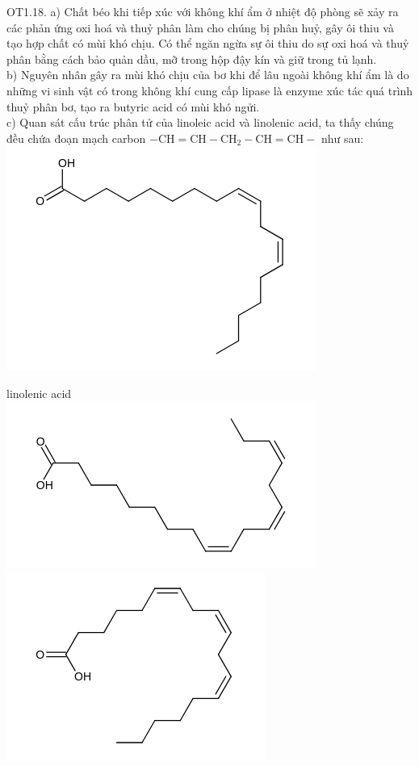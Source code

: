 \documentclass[10pt]{article}
\begin{document}
OT1.18. a) Chất béo khi tiếp xúc với không khí ẩm ở nhiệt độ phòng sẽ xảy ra các phản ứng oxi hoá và thuỷ phân làm cho chúng bị phân huỷ, gây ôi thiu và tạo hợp chất có mùi khó chịu. Có thể ngăn ngừa sự ôi thiu do sự oxi hoá và thuỷ phân bằng cách bảo quản dầu, mỡ trong hộp đậy kín và giữ trong tủ lạnh.\\
b) Nguyên nhân gây ra mùi khó chịu của bơ khi để lâu ngoài không khí ẩm là do những vi sinh vật có trong không khí cung cấp lipase là enzyme xúc tác quá trình thuỷ phân bơ, tạo ra butyric acid có mùi khó ngửi.\\
c) Quan sát cấu trúc phân tử của linoleic acid và linolenic acid, ta thấy chúng đều chứa đoạn mạch carbon $-\mathrm{CH}=\mathrm{CH}-\mathrm{CH}_{2}-\mathrm{CH}=\mathrm{CH}-$ như sau:\\
\includegraphics{smile-1a8ec449a9cb6da217b944a9b98b7de326691042}

linolenic acid\\
\includegraphics{smile-4c2496252ff15247b50bbfd5e3b00d95a212b740}\\
\includegraphics{smile-e55ca94492ca2fdcbcf52abd560638da1d8f75bb}
\end{document}
